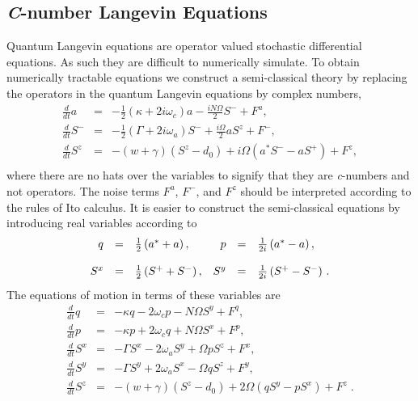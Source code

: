 \documentclass[aps,
twocolumn,
showpacs,
superscriptaddress,groupedaddress]{revtex4}
\begin{document}
\subsection{\textit{C}-number Langevin Equations}

Quantum Langevin equations are operator valued stochastic differential
equations.  As such they are difficult to numerically simulate. To
obtain numerically tractable equations we construct a semi-classical
theory by replacing the operators in the quantum Langevin equations by
complex numbers,
\begin{eqnarray}
\frac{d}{dt} a&=& -\frac{1}{2}  (\kappa +2i\omega_c) a
-\frac{i N \Omega}{2} S^{-}
+F^{a},
\label{Lac}\\
\frac{d}{dt} S^{-} &=& -\frac{1}{2}  \left(\Gamma +2 i \omega_a \right)  S^{-}
+\frac{i \Omega}{2} a S^{z}
+F^{-},\\
\frac{d}{dt} S^{z} &=& -(w+\gamma)\left( S^{z} - d_0\right)
+i\Omega \left( a^{*}S^{-} - a S^{+} \right)
+F^{z},\nonumber\\
\label{Lszc}
\end{eqnarray}
where there are no hats over the variables to signify that they are
\textit{c}-numbers and not operators.  The noise terms $F^a$, $F^-$, and
$F^z$ should be interpreted according to the rules of Ito calculus. It
is easier to construct the semi-classical equations by introducing real
variables according to
\begin{equation}
\begin{array}[b]{rclrcl}
q &=&
\frac{1}{2} \left( a^{*} + a \right),&
p &=&
\frac{1}{2i} \left( a^{*} - a \right),
\\[1pc]
S^x &=&
\frac{1}{2} \left( S^{+} + S^{-} \right),&
S^y &=&
\frac{1}{2i} \left( S^{+} - S^{-} \right)\,.
\end{array}
\end{equation}
The equations of motion in terms of these variables are
\begin{eqnarray}
\frac{d}{dt} q &=& -\kappa q - 2 \omega_c p - N \Omega S^{y} + F^{q},
\label{cq1}
\\
\frac{d}{dt} p&=& -\kappa p + 2 \omega_c q + N \Omega S^{x} + F^{p},
\\
\frac{d}{dt} S^{x} &=&
-\Gamma S^{x}  - 2 \omega_a S^{y} + \Omega p S^{z} + F^{x},
\\
\frac{d}{dt} S^{y} &=&
-\Gamma S^{y}  + 2 \omega_a S^{x} - \Omega q S^{z} + F^{y},
\\
\frac{d}{dt} S^{z} &=& -(w+\gamma)\left( S^{z} - d_0\right)
+2 \Omega \left( q S^{y} - p S^{x} \right)
+F^{z}\;.
\nonumber
\\
\label{eqn:cnumberlangevin}
\end{eqnarray}
\end{document}
